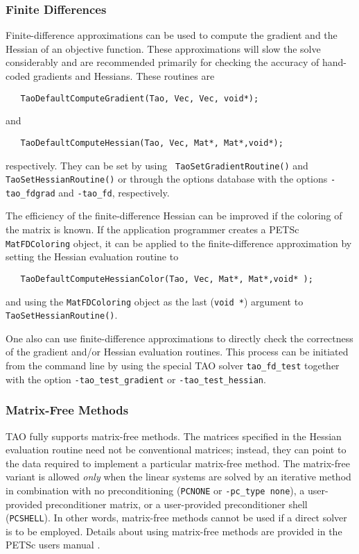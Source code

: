 \subsubsection{Finite Differences} 
Finite-difference approximations can be used to compute the gradient and the
Hessian of an objective
function.  These approximations will slow the solve considerably and 
are recommended primarily  
for checking the accuracy of hand-coded gradients and Hessians.
These routines are
\begin{verbatim}
   TaoDefaultComputeGradient(Tao, Vec, Vec, void*);
\end{verbatim}
and 
\begin{verbatim}
   TaoDefaultComputeHessian(Tao, Vec, Mat*, Mat*,void*);
\end{verbatim}
respectively. They can be set by using {\tt
TaoSetGradientRoutine()} and 
{\tt TaoSetHessianRoutine()} or through the options database with the
options {\tt -tao\_fdgrad} and {\tt -tao\_fd}, respectively.

The efficiency of the finite-difference Hessian can be improved if the
coloring of the matrix is known.  If the application programmer creates
a PETSc {\tt MatFDColoring} object, it can be applied to the finite-difference
approximation by setting the Hessian evaluation routine to
\begin{verbatim}
   TaoDefaultComputeHessianColor(Tao, Vec, Mat*, Mat*,void* );
\end{verbatim}
and using the {\tt MatFDColoring} object as
the last ({\tt void *}) argument to {\tt TaoSetHessianRoutine()}.

One also can use finite-difference approximations to directly check
the correctness of the gradient and/or Hessian evaluation routines.
This process can be initiated from the command line by using the special 
TAO solver 
{\tt tao\_fd\_test} together with the option
{\tt -tao\_test\_gradient} or {\tt -tao\_test\_hessian}.

\subsubsection{Matrix-Free Methods}
TAO fully supports matrix-free methods. The matrices specified in the
Hessian evaluation routine need not be conventional
matrices; instead, they can point to the data required to implement a
particular matrix-free method.  The matrix-free variant is allowed
{\em only} when the linear systems are solved by an iterative method
in combination with no preconditioning ({\tt PCNONE} or {\tt -pc\_type none}),
a user-provided preconditioner matrix, or a user-provided preconditioner
shell ({\tt PCSHELL}). In other words,
matrix-free methods cannot be used if a direct solver is to 
be employed.  %
Details about using matrix-free methods are provided in the
PETSc users manual \cite{petsc-user-ref}.


